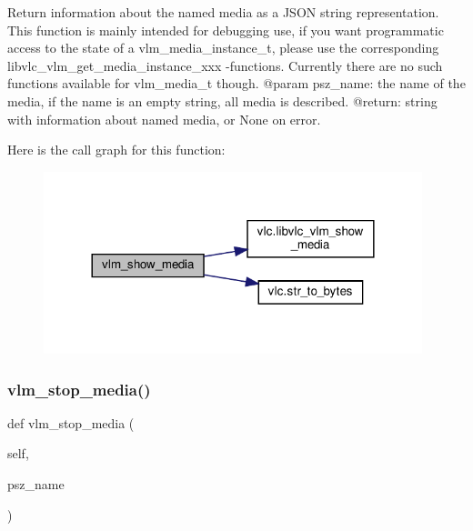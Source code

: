 \begin{DoxyVerb}Return information about the named media as a JSON
string representation.
This function is mainly intended for debugging use,
if you want programmatic access to the state of
a vlm_media_instance_t, please use the corresponding
libvlc_vlm_get_media_instance_xxx -functions.
Currently there are no such functions available for
vlm_media_t though.
@param psz_name: the name of the media, if the name is an empty string, all media is described.
@return: string with information about named media, or None on error.
\end{DoxyVerb}
 Here is the call graph for this function\+:
\nopagebreak
\begin{figure}[H]
\begin{center}
\leavevmode
\includegraphics[width=312pt]{classvlc_1_1_instance_a49b576ac1b1d7db57ebaf616d02cc7dc_cgraph}
\end{center}
\end{figure}
\mbox{\label{classvlc_1_1_instance_a0b4acb6d5c4bcc6b134887a58079427d}} 
\subsubsection{\texorpdfstring{vlm\+\_\+stop\+\_\+media()}{vlm\_stop\_media()}}
{\footnotesize\ttfamily def vlm\+\_\+stop\+\_\+media (\begin{DoxyParamCaption}\item[{}]{self,  }\item[{}]{psz\+\_\+name }\end{DoxyParamCaption})}

